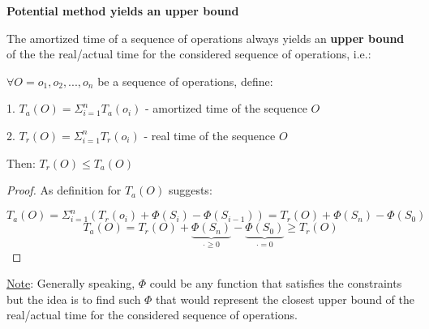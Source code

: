 \begin{theorem}
    \textbf{Potential method yields an upper bound}

    The amortized time of a sequence of operations always yields an \textbf{upper bound} of the the real/actual time for the considered sequence of operations, i.e.:

    $\forall O = o_1, o_2, ..., o_n$ be a sequence of operations, define:

    1. $T_{a}(O) = \Sigma_{i=1}^{n} T_{a}(o_i)$ - amortized time of the sequence $O$

    2. $T_{r}(O) = \Sigma_{i=1}^{n} T_r(o_i)$ - real time of the sequence $O$

    Then: $T_r(O) \leq T_a(O)$

\end{theorem}

\begin{proof}

    As definition for $T_a(O)$ suggests:

    $$ T_{a}(O) = \Sigma_{i=1}^{n} (T_{r}(o_i) + \Phi(S_i) - \Phi(S_{i-1})) = T_{r}(O) + \Phi(S_n) - \Phi(S_0) $$
    $$ T_{a}(O) = T_{r}(O) + \underbrace{\Phi(S_n)}_{\cdot \geq 0} - \underbrace{\Phi(S_0)}_{\cdot = 0} \geq T_{r}(O) $$

\end{proof}

\underline{Note}: Generally speaking, $\Phi$ could be any function that satisfies the constraints but the idea is to find such $\Phi$ that would represent the closest upper bound of the real/actual time for the considered sequence of operations.

